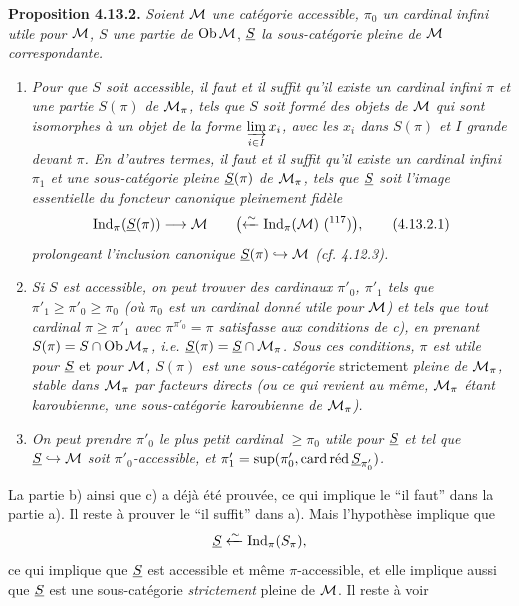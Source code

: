 \textbf{Proposition 4.13.2.} \textit{Soient $\M$ une catégorie accessible, $\pi_0$ un cardinal infini utile pour $\M$, $S$ une partie de} $\Ob\M$, \textit{$\uS$ la sous-catégorie pleine de $\M$ correspondante.}

\begin{enumerate}
\item[\textit{a)}] \textit{Pour que $S$ soit accessible, il faut et il suffit qu'il existe un cardinal infini $\pi$ et une partie $S(\pi)$ de $\M_\pi$, tels que $S$ soit formé des objets de $\M$ qui sont isomorphes à un objet de la forme $\varinjlim\limits_{i\in I} x_i$, avec les $x_i$ dans $S(\pi)$ et $I$ grande devant $\pi$. En d'autres termes, il faut et il suffit qu'il existe un cardinal infini $\pi_1$ et une sous-catégorie pleine %
$\uS(\pi)$ de $\M_\pi$, tels que $\uS$ soit l'image essentielle du foncteur canonique pleinement fidèle}
\[
\Ind_\pi(\uS(\pi)) \longrightarrow \M \qquad \bigl(\xleftarrow{\sim} \Ind_\pi(\M)\ \text{(\footnotemark[117])}\bigr) , \tag*{(4.13.2.1)} %
\]
\textit{prolongeant l'inclusion canonique $\uS(\pi) \hookrightarrow \M$ (cf. 4.12.3).}
\item[\textit{b)}] 
\textit{Si $S$ est accessible, on peut trouver des cardinaux $\pi'_0$, $\pi'_1$ tels que $\pi'_1 \geqslant \pi'_0 \geqslant \pi_0$ (où $\pi_0$ est un cardinal donné utile pour $\M$)}
\textit{et tels que tout cardinal $\pi \geqslant \pi'_1$ avec $\pi^{\pi'_0} = \pi$ satisfasse aux conditions de c), en prenant $S(\pi) = S \cap \Ob\M_\pi$, i.e. $\uS(\pi) = \uS \cap \M_\pi$. Sous ces conditions, $\pi$ est utile pour $\uS$} et \textit{pour $\M$, $S(\pi)$ est une sous-catégorie} strictement \textit{pleine de $\M_\pi$, stable dans $\M_\pi$ par facteurs directs (ou ce qui revient au même, $\M_\pi$ étant karoubienne, une sous-catégorie karoubienne de $\M_\pi$).}
\item[\textit{c)}] \textit{On peut prendre $\pi'_0$ le plus petit cardinal $\geqslant \pi_0$ utile pour $\uS$ et tel que $\uS \hookrightarrow \M$ soit $\pi'_0$-accessible, et $\pi'_1 = \sup(\pi'_0, \card\red\uS_{\pi'_0})$.}
\end{enumerate}

La partie b) ainsi que c) a déjà été prouvée, ce qui implique le “il faut” dans la partie a). Il reste à prouver le “il suffit” dans a). Mais l'hypothèse implique que
\[
\uS \xleftarrow{\sim} \Ind_\pi(S_\pi) ,
\]
ce qui implique que $\uS$ est accessible et même $\pi$-accessible, et elle implique aussi que $\uS$ est une sous-catégorie \textit{strictement} pleine de $\M$. Il reste à voir

